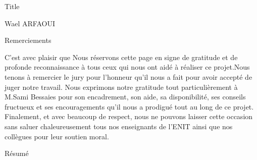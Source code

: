 \documentclass[11pt,fleqn]{book} %
\begin{document}
	\let\cleardoublepage\clearpage
	\begingroup
	\thispagestyle{empty}
	
	\centering
	\vspace*{9cm}
	\par\normalfont\fontsize{35}{35}\sffamily\selectfont
	Title\par %
	\vspace*{1cm}
	{\Huge Wael ARFAOUI}\par %
	\endgroup
	
	\frontmatter
	
	
	\begin{center}
		\vspace*{5cm}
		\par\normalfont\fontsize{20}{20}\sffamily\selectfont
		Remerciements
		\par\normalfont\fontsize{14}{14}\sffamily\selectfont
		\vspace*{1cm}
		C’est avec plaisir que Nous réservons cette page en signe de gratitude et de profonde reconnaissance à tous ceux qui nous ont aidé à réaliser ce projet.Nous tenons à remercier le jury pour l’honneur qu’il nous a fait pour avoir accepté de juger notre travail. Nous exprimons notre gratitude tout particulièrement à M.Sami Bessaies pour son encadrement, son aide, sa disponibilité, ses conseils fructueux et ses encouragements qu’il nous a prodigué tout au long de ce projet.	Finalement, et avec beaucoup de respect, nous ne pouvons laisser cette occasion sans saluer chaleureusement tous nos enseignants de l’ENIT ainsi que nos collègues pour leur soutien moral.\par
	\end{center}
	
	
	
	\newpage
	\begin{center}
		\vspace*{5cm}
		\normalfont
		{\LARGE Résumé}
		\vspace*{1cm}
	\end{center}
	
\end{document}
